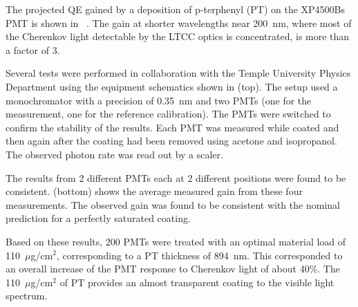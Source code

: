 The projected QE gained by a deposition of p-terphenyl (PT) on the XP4500Bs PMT is shown in
~\cite{Koczon:1457653}. The gain at shorter wavelengths near 200~nm,
where most of the Cherenkov light detectable by the LTCC optics is concentrated, is more than a factor of 3.

Several tests were performed in collaboration with the Temple University Physics Department using the equipment
schematics shown in  (top). The setup used a monochromator with a precision
of 0.35~nm and two PMTs (one for the measurement, one for the reference calibration). The PMTs were switched
to confirm the stability of the results. Each PMT was measured while coated and then again after the coating had
been removed using acetone and isopropanol. The observed photon rate was read out by a scaler.

The results from 2 different PMTs each at 2 different positions were found to be consistent.
 (bottom) shows the average measured gain from these four measurements. The
observed gain was found to be consistent with the nominal prediction for a perfectly saturated coating.

Based on these results, 200 PMTs were treated \cite{Joosten:2016lcl} with an optimal material load of
110~$\mu$g/cm$^2$, corresponding to a PT thickness of 894~nm. This corresponded to an overall increase of the PMT
response to Cherenkov light of about 40\%. The 110~$\mu$g/cm$^2$ of PT provides an almost transparent coating to
the visible light spectrum.
